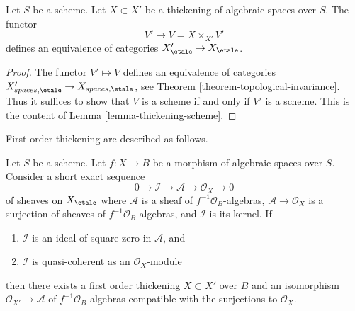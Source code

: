 \begin{lemma}
\label{lemma-thickening-equivalence}
Let $S$ be a scheme. Let $X \subset X'$ be a thickening of algebraic spaces
over $S$. The functor
$$
V' \longmapsto V = X \times_{X'} V'
$$
defines an equivalence of categories
$X'_\etale \to X_\etale$.
\end{lemma}

\begin{proof}
The functor $V' \mapsto V$ defines an equivalence of categories
$X'_{spaces, \etale} \to X_{spaces, \etale}$, see
Theorem \ref{theorem-topological-invariance}.
Thus it suffices to show that $V$ is a scheme if and only if $V'$ is
a scheme. This is the content of
Lemma \ref{lemma-thickening-scheme}.
\end{proof}

\noindent
First order thickening are described as follows.

\begin{lemma}
\label{lemma-first-order-thickening}
Let $S$ be a scheme.
Let $f : X \to B$ be a morphism of algebraic spaces over $S$.
Consider a short exact sequence
$$
0 \to \mathcal{I} \to \mathcal{A} \to \mathcal{O}_X \to 0
$$
of sheaves on $X_\etale$ where $\mathcal{A}$ is a sheaf of
$f^{-1}\mathcal{O}_B$-algebras, $\mathcal{A} \to \mathcal{O}_X$ is a surjection
of sheaves of $f^{-1}\mathcal{O}_B$-algebras, and $\mathcal{I}$ is its kernel.
If
\begin{enumerate}
\item $\mathcal{I}$ is an ideal of square zero in $\mathcal{A}$, and
\item $\mathcal{I}$ is quasi-coherent as an $\mathcal{O}_X$-module
\end{enumerate}
then there exists a first order thickening
$X \subset X'$ over $B$ and an isomorphism
$\mathcal{O}_{X'} \to \mathcal{A}$ of $f^{-1}\mathcal{O}_B$-algebras
compatible with the surjections to $\mathcal{O}_X$.
\end{lemma}


